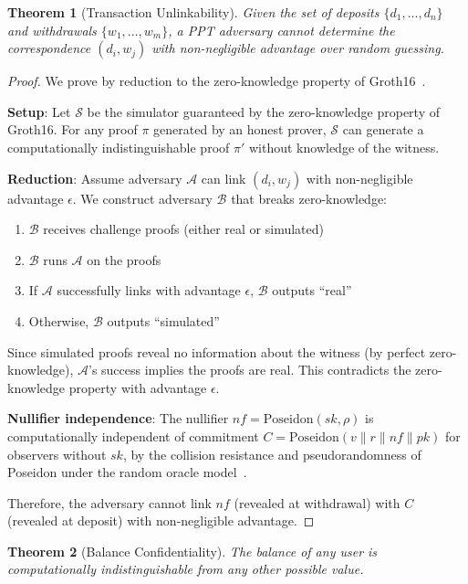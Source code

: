 \documentclass[11pt]{article}
\theoremstyle{definition}
\theoremstyle{plain}
\newtheorem{theorem}{Theorem}[section]
\theoremstyle{remark}
\begin{document}
\begin{theorem}[Transaction Unlinkability]
\label{thm:unlinkability}
Given the set of deposits $\{d_1, ..., d_n\}$ and withdrawals $\{w_1, ..., w_m\}$, a PPT adversary cannot determine the correspondence $(d_i, w_j)$ with non-negligible advantage over random guessing.
\end{theorem}

\begin{proof}
We prove by reduction to the zero-knowledge property of Groth16~\cite{groth2016size}.

\textbf{Setup}: Let $\mathcal{S}$ be the simulator guaranteed by the zero-knowledge property of Groth16. For any proof $\pi$ generated by an honest prover, $\mathcal{S}$ can generate a computationally indistinguishable proof $\pi'$ without knowledge of the witness.

\textbf{Reduction}: Assume adversary $\mathcal{A}$ can link $(d_i, w_j)$ with non-negligible advantage $\epsilon$. We construct adversary $\mathcal{B}$ that breaks zero-knowledge:

\begin{enumerate}
    \item $\mathcal{B}$ receives challenge proofs (either real or simulated)
    \item $\mathcal{B}$ runs $\mathcal{A}$ on the proofs
    \item If $\mathcal{A}$ successfully links with advantage $\epsilon$, $\mathcal{B}$ outputs ``real''
    \item Otherwise, $\mathcal{B}$ outputs ``simulated''
\end{enumerate}

Since simulated proofs reveal no information about the witness (by perfect zero-knowledge), $\mathcal{A}$'s success implies the proofs are real. This contradicts the zero-knowledge property with advantage $\epsilon$.

\textbf{Nullifier independence}: The nullifier $nf = \text{Poseidon}(sk, \rho)$ is computationally independent of commitment $C = \text{Poseidon}(v \| r \| nf \| pk)$ for observers without $sk$, by the collision resistance and pseudorandomness of Poseidon under the random oracle model~\cite{grassi2021poseidon}.

Therefore, the adversary cannot link $nf$ (revealed at withdrawal) with $C$ (revealed at deposit) with non-negligible advantage.
\end{proof}

\begin{theorem}[Balance Confidentiality]
\label{thm:confidentiality}
The balance of any user is computationally indistinguishable from any other possible value.
\end{theorem}
\end{document}
